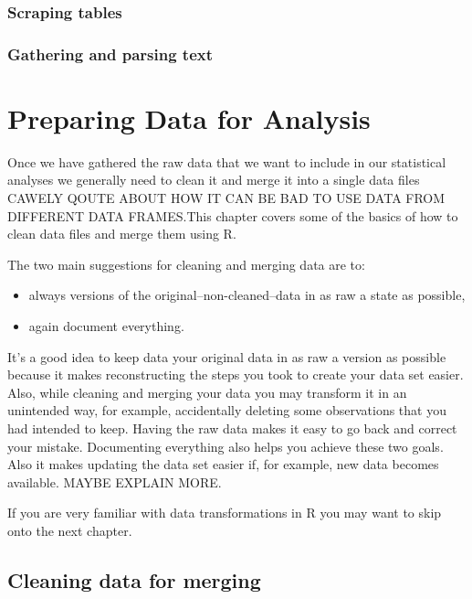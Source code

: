 \documentclass[ChapterTOCs,krantz1]{krantz}\usepackage{graphicx, color}
\begin{document}
{{\subsection{Scraping tables}

\subsection{Gathering and parsing text}





\chapter{Preparing Data for Analysis}\label{DataClean}

Once we have gathered the raw data that we want to include in our statistical analyses we generally need to clean it and merge it into a single data files CAWELY QOUTE ABOUT HOW IT CAN BE BAD TO USE DATA FROM DIFFERENT DATA FRAMES.This chapter covers some of the basics of how to clean data files and merge them using R. 

The two main suggestions for cleaning and merging data are to:

\begin{itemize}
    \item always versions of the original--non-cleaned--data in as raw a state as possible,
    \item again document everything.
\end{itemize}

It's a good idea to keep data your original data in as raw a version as possible because it makes reconstructing the steps you took to create your data set easier. Also, while cleaning and merging your data you may transform it in an unintended way, for example, accidentally deleting some observations that you had intended to keep. Having the raw data makes it easy to go back and correct your mistake. Documenting everything also helps you achieve these two goals. Also it makes updating the data set easier if, for example, new data becomes available. MAYBE EXPLAIN MORE.

If you are very familiar with data transformations in R you may want to skip onto the next chapter. 

\section{Cleaning data for merging}

}}
\end{document}
